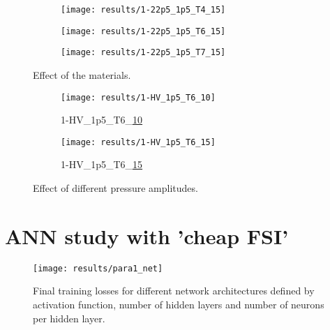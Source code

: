 \begin{figure}
    \centering
    \begin{subfigure}[b]{0.32\textwidth}
        \centering
        \texttt{[image: results/1-22p5\_1p5\_T4\_15]}
        \caption{}
        \label{fig:T4}
    \end{subfigure}
    \begin{subfigure}[b]{0.32\textwidth}
        \centering
        \texttt{[image: results/1-22p5\_1p5\_T6\_15]}
        \caption{}
        \label{fig:T6}
    \end{subfigure}
    \begin{subfigure}[b]{0.32\textwidth}
        \centering
        \texttt{[image: results/1-22p5\_1p5\_T7\_15]}
        \caption{}
        \label{fig:T7}
    \end{subfigure}
    \caption{Effect of the materials.}
    \label{fig:effect_material}
\end{figure}

\begin{figure}
    \centering
    \begin{subfigure}[b]{0.45\textwidth}
        \centering
        \texttt{[image: results/1-HV\_1p5\_T6\_10]}
        \caption{1-HV\_1p5\_T6\_\textcolor{tab:red}{\underline{10}}}
        \label{fig:1-HV_1p5_T6_10}
    \end{subfigure}
    \begin{subfigure}[b]{0.45\textwidth}
        \centering
        \texttt{[image: results/1-HV\_1p5\_T6\_15]}
        \caption{1-HV\_1p5\_T6\_\textcolor{tab:red}{\underline{15}}}
        \label{fig:1-HV_1p5_T6_15_amp}
    \end{subfigure}
    \caption{Effect of different pressure amplitudes.}
    \label{fig:effect_amp}
\end{figure}

\section{ANN study with 'cheap FSI'}

\begin{figure}
    \centering
    \texttt{[image: results/para1\_net]}
    \caption{Final training losses for different network architectures defined by activation function, number of hidden layers and number of neurons per hidden layer.}
    \label{fig:para1_net}
\end{figure}

